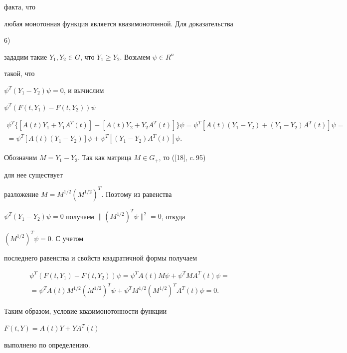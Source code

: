 {\begin{pf}
факта, что 


любая монотонная функция является квазимонотонной. Для доказательства 


6) 


зададим такие $Y_1,Y_2\in G$, что $Y_1\ge Y_2$. Возьмем $\psi\in R^n$ 


такой, что 


$\psi^T(Y_1-Y_2)\psi=0$, и вычислим 


$\psi^T(F(t,Y_1)-F(t,Y_2))\psi$ 


\begin{multline*}  


\psi^T\{[A(t)Y_1+Y_1A^T(t)]- 


[A(t)Y_2+Y_2A^T(t)]\}\psi= 


\psi^T[A(t)(Y_1-Y_2)+(Y_1-Y_2)A^T(t)]\psi= \\


%


=\psi^T[A(t)(Y_1-Y_2)]\psi+\psi^T[(Y_1-Y_2)A^T(t)]\psi. 


\end{multline*}  


Обозначим $M=Y_1-Y_2$. Так как матрица $M\in G_+$, то ([18], c.\,95) 


для нее существует 


разложение $M=M^{1/2}(M^{1/2})^T$. Поэтому из равенства 


$\psi^T(Y_1-Y_2)\psi=0$ получаем $\|(M^{1/2})^T\psi\|^2=0$, откуда 


$(M^{1/2})^T\psi=0$. С учетом 


последнего равенства и свойств квадратичной формы получаем 


\begin{multline*}  


\psi^T(F(t,Y_1)-F(t,Y_2))\psi=\psi^T A(t)M\psi+ 


\psi^T M A^T(t)\psi=\\


%


=\psi^T A(t)M^{1/2}(M^{1/2})^T\psi+ 


\psi^T M^{1/2}(M^{1/2})^T A^T(t)\psi=0. 


\end{multline*}  


Таким образом, условие квазимонотонности функции 


$F(t,Y)=A(t)Y+Y A^T(t)$ 


выполнено по определению. 


 



\end{pf}}
